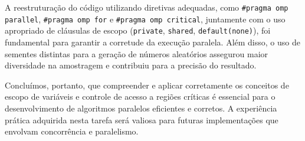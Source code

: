 \documentclass[a4paper, 12pt]{article}
\begin{document}
	A reestruturação do código utilizando diretivas adequadas, como \texttt{\#pragma omp parallel}, \texttt{\#pragma omp for} e \texttt{\#pragma omp critical}, juntamente com o uso apropriado de cláusulas de escopo (\texttt{private}, \texttt{shared}, \texttt{default(none)}), foi fundamental para garantir a corretude da execução paralela. Além disso, o uso de sementes distintas para a geração de números aleatórios assegurou maior diversidade na amostragem e contribuiu para a precisão do resultado.
	
	Concluímos, portanto, que compreender e aplicar corretamente os conceitos de escopo de variáveis e controle de acesso a regiões críticas é essencial para o desenvolvimento de algoritmos paralelos eficientes e corretos. A experiência prática adquirida nesta tarefa será valiosa para futuras implementações que envolvam concorrência e paralelismo.
	 
	
\end{document}
